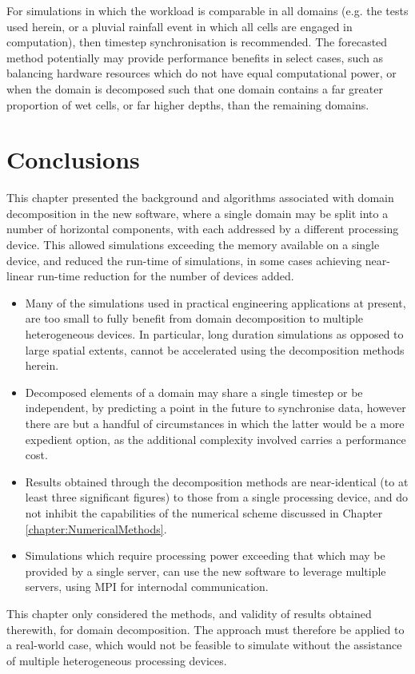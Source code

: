 For simulations in which the workload is comparable in all domains (e.g. the tests used herein, or a pluvial rainfall event in which all cells are engaged in computation), then timestep synchronisation is recommended. The forecasted method potentially may provide performance benefits in select cases, such as balancing hardware resources which do not have equal computational power, or when the domain is decomposed such that one domain contains a far greater proportion of wet cells, or far higher depths, than the remaining domains.

\section{Conclusions}

This chapter presented the background and algorithms associated with domain decomposition in the new software, where a single domain may be split into a number of horizontal components, with each addressed by a different processing device. This allowed simulations exceeding the memory available on a single device, and reduced the run-time of simulations, in some cases achieving near-linear run-time reduction for the number of devices added.

\begin{itemize}
	\item Many of the simulations used in practical engineering applications at present, are too small to fully benefit from domain decomposition to multiple heterogeneous devices. In particular, long duration simulations as opposed to large spatial extents, cannot be accelerated using the decomposition methods herein.
	\item Decomposed elements of a domain may share a single timestep or be independent, by predicting a point in the future to synchronise data, however there are but a handful of circumstances in which the latter would be a more expedient option, as the additional complexity involved carries a performance cost.
	\item Results obtained through the decomposition methods are near-identical (to at least three significant figures) to those from a single processing device, and do not inhibit the capabilities of the numerical scheme discussed in Chapter \ref{chapter:NumericalMethods}.
	\item Simulations which require processing power exceeding that which may be provided by a single server, can use the new software to leverage multiple servers, using MPI for internodal communication.
\end{itemize}

This chapter only considered the methods, and validity of results obtained therewith, for domain decomposition. The approach must therefore be applied to a real-world case, which would not be feasible to simulate without the assistance of multiple heterogeneous processing devices.